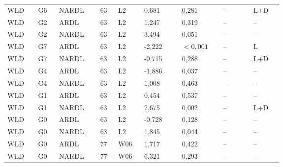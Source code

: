 {\begin{longtable}{p{0.075\linewidth}p{0.05\linewidth}p{0.09\linewidth}p{0.04\linewidth}p{0.05\linewidth}p{0.1\linewidth}p{0.085\linewidth}p{0.085\linewidth}p{0.075\linewidth}}
WLD & G6 & NARDL & 63 & L2 & 0,681 & 0,281 & -- & L+D\\
WLD & G2 & ARDL & 63 & L2 & 1,247 & 0,319 & -- & --\\
WLD & G2 & NARDL & 63 & L2 & 3,494 & 0,051 & -- & --\\
WLD & G7 & ARDL & 63 & L2 & -2,222 & \(<0{,}001\) & -- & L\\
WLD & G7 & NARDL & 63 & L2 & -0,715 & 0,288 & -- & L+D\\
WLD & G4 & ARDL & 63 & L2 & -1,886 & 0,037 & -- & --\\
WLD & G4 & NARDL & 63 & L2 & 1,008 & 0,463 & -- & --\\
WLD & G1 & ARDL & 63 & L2 & 0,454 & 0,537 & -- & --\\
WLD & G1 & NARDL & 63 & L2 & 2,675 & 0,002 & -- & L+D\\
WLD & G0 & ARDL & 63 & L2 & -0,728 & 0,128 & -- & --\\
WLD & G0 & NARDL & 63 & L2 & 1,845 & 0,044 & -- & --\\
WLD & G0 & ARDL & 77 & W06 & 1,717 & 0,422 & -- & --\\
WLD & G0 & NARDL & 77 & W06 & 6,321 & 0,293 & -- & --\\
\end{longtable}
}